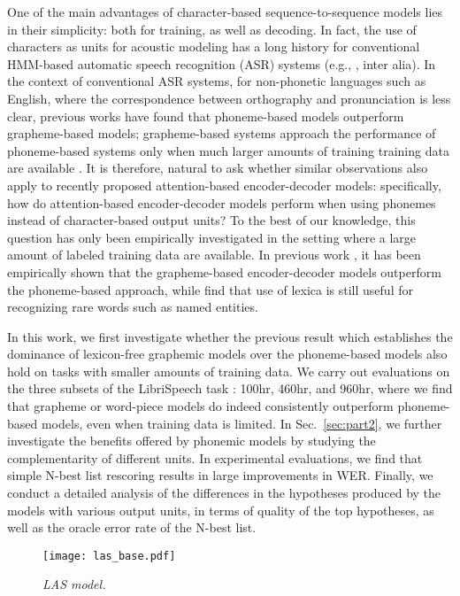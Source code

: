 One of the main advantages of character-based sequence-to-sequence models lies in their simplicity:
both for training, as well as decoding. 
In fact, the use of characters as units for acoustic modeling has a long history for conventional
HMM-based automatic speech recognition (ASR) systems (e.g., \cite{kanthak02, KillerSS03, SungHBS09}, inter alia).
In the context of conventional ASR systems, for non-phonetic languages such as English, where the correspondence between orthography and pronunciation is less clear, previous works \cite{kanthak02, KillerSS03} have found that phoneme-based models outperform grapheme-based models; grapheme-based systems approach the performance of phoneme-based systems only when much larger amounts of training training data are available \cite{SungHBS09}.
It is therefore, natural to ask whether similar observations also apply to recently proposed attention-based encoder-decoder models: specifically, how do attention-based encoder-decoder models perform when using phonemes instead of character-based output units? 
To the best of our knowledge, this question has only been empirically investigated in the setting where a large amount of labeled training data are available. In previous work \cite{sainath2017no, zhou2018comparison}, it has been empirically shown that the grapheme-based encoder-decoder models outperform the phoneme-based approach, while \cite{sainath2017no} find that use of lexica is still useful for recognizing rare words such as named entities. 

In this work, we first investigate whether the previous result \cite{sainath2017no} which establishes the dominance of lexicon-free graphemic models over the phoneme-based models also hold on tasks with smaller amounts of training data.
We carry out evaluations on the three subsets of the LibriSpeech task \cite{panayotov2015librispeech}: 100hr, 460hr, and 960hr, where we find that grapheme or word-piece models do indeed consistently outperform phoneme-based models, even when training data is limited.
In Sec.~\ref{sec:part2}, we further investigate the benefits offered by phonemic models by studying the complementarity of different units. In experimental evaluations, we find that simple N-best list rescoring results in large improvements in WER. Finally, we conduct a detailed analysis of the differences in the hypotheses produced by the models with various output units, in terms of quality of the top hypotheses, as well as the oracle error rate of the N-best list.
\begin{figure}[b]
	\vspace{-5mm}
	\centerline{\texttt{[image: las\_base.pdf]}}
	\caption{\it LAS model.}
	\label{fig:las_base}
\end{figure}
\vspace{-2mm}
